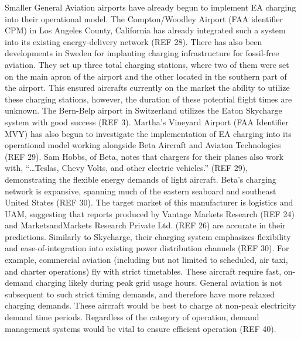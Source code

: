 \documentclass{article}
\begin{document}
Smaller General Aviation airports have already begun to implement EA charging into their operational model. 
The Compton/Woodley Airport (FAA identifier CPM) in Los Angeles County, California has already integrated such a system into its existing energy-delivery network (REF 28). 
There has also been developments in Sweden for implanting charging infrastructure for fossil-free aviation. 
They set up three total charging stations, where two of them were set on the main apron of the airport and the other located in the southern part of the airport. 
This ensured aircrafts currently on the market the ability to utilize these charging stations, however, the duration of these potential flight times are unknown. 
The Bern-Belp airport in Switzerland utilizes the Eaton Skycharge system with good success (REF 3). 
Martha’s Vineyard Airport (FAA Identifier MVY) has also begun to investigate the implementation of EA charging into its operational model working alongside Beta Aircraft and Aviaton Technologies (REF 29). 
Sam Hobbs, of Beta, notes that chargers for their planes also work with, “…Teslas, Chevy Volts, and other electric vehicles.” (REF 29), demonstrating the flexible energy demands of light aircraft. 
Beta’s charging network is expansive, spanning much of the eastern seaboard and southeast United States (REF 30). The target market of this manufacturer is logistics and UAM, suggesting that reports produced by Vantage Markets Research (REF 24) and MarketsandMarkets Research Private Ltd. (REF 26) are accurate in their predictions. 
Similarly to Skycharge, their charging system emphasizes flexibility and ease-of-integration into existing power distribution channels (REF 30). 
For example, commercial aviation (including but not limited to scheduled, air taxi, and charter operations) fly with strict timetables. These aircraft require fast, on-demand charging likely during peak grid usage hours. 
General aviation is not subsequent to such strict timing demands, and therefore have more relaxed charging demands. 
These aircraft would be best to charge at non-peak electricity demand time periods. 
Regardless of the category of operation, demand management systems would be vital to ensure efficient operation (REF 40).\par
\end{document}
